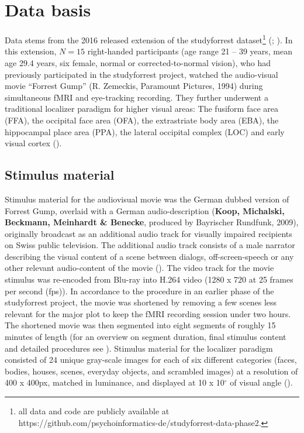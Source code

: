 \documentclass[a4paper, 12pt]{scrreprt}
\begin{document}
{\section{Data basis}

Data stems from the 2016 released extension of the studyforrest dataset\footnote{all data and code are publicly available at https://github.com/psychoinformatics-de/studyforrest-data-phase2.} (\cite{hanke2016studyforrest}; \cite{sengupta2016studyforrest}). In this extension, $N = 15$ right-handed participants (age range 21 – 39 years, mean age 29.4 years, six female, normal or corrected-to-normal vision), who had previously participated in the studyforrest project, watched the audio-visual movie “Forrest Gump” (R. Zemeckis, Paramount Pictures, 1994) during simultaneous fMRI and eye-tracking recording. They further underwent a traditional localizer paradigm for higher visual areas: The fusiform face area (FFA), the occipital face area (OFA), the extrastriate body area (EBA), the hippocampal place area (PPA), the lateral occipital complex (LOC) and early visual cortex (\cite{sengupta2016studyforrest}).

\subsection{Stimulus material}

Stimulus material for the audiovisual movie was the German dubbed version of Forrest Gump, overlaid with a German audio-description (\textbf{Koop, Michalski, Beckmann, Meinhardt \& Benecke}, produced by Bayrischer Rundfunk, 2009), originally broadcast as an additional audio track for visually impaired recipients on Swiss public television. The additional audio track consists of a male narrator describing the visual content of a scene between dialogs, off-screen-speech or any other relevant audio-content of the movie (\cite{hanke2014high}). The video track for the movie stimulus was re-encoded from Blu-ray into H.264 video (1280 x 720 at 25 frames per second (fps)). In accordance to the procedure in an earlier phase of the studyforrest project, the movie was shortened by removing a few scenes less relevant for the major plot to keep the fMRI recording session under two hours. The shortened movie was then segmented into eight segments of roughly 15 minutes of length (for an overview on segment duration, final stimulus content and detailed procedures see \textcite{hanke2014high}). Stimulus material for the localizer paradigm consisted of 24 unique gray-scale images for each of six different categories (faces, bodies, houses, scenes, everyday objects, and scrambled images) at a resolution of 400 x 400px, matched in luminance, and displayed at 10 x 10$^\circ$ of visual angle (\cite{sengupta2016studyforrest}).


}
\end{document}
